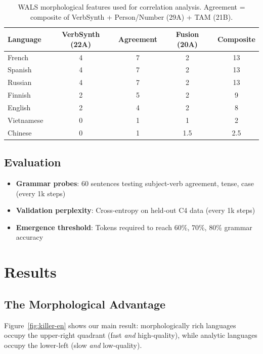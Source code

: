 \documentclass[11pt]{article}
\begin{document}
\begin{table}[h]
\centering
\begin{tabular}{lcccc}
\toprule
Language & VerbSynth (22A) & Agreement & Fusion (20A) & Composite \\
\midrule
French & 4 & 7 & 2 & 13 \\
Spanish & 4 & 7 & 2 & 13 \\
Russian & 4 & 7 & 2 & 13 \\
Finnish & 2 & 5 & 2 & 9 \\
English & 2 & 4 & 2 & 8 \\
Vietnamese & 0 & 1 & 1 & 2 \\
Chinese & 0 & 1 & 1.5 & 2.5 \\
\bottomrule
\end{tabular}
\caption{WALS morphological features used for correlation analysis. Agreement = composite of VerbSynth + Person/Number (29A) + TAM (21B).}
\label{tab:wals-en}
\end{table}

\subsection{Evaluation}

\begin{itemize}
    \item \textbf{Grammar probes}: 60 sentences testing subject-verb agreement, tense, case (every 1k steps)
    \item \textbf{Validation perplexity}: Cross-entropy on held-out C4 data (every 1k steps)
    \item \textbf{Emergence threshold}: Tokens required to reach 60\%, 70\%, 80\% grammar accuracy
\end{itemize}

\section{Results}

\subsection{The Morphological Advantage}

Figure~\ref{fig:killer-en} shows our main result: morphologically rich languages occupy the upper-right quadrant (fast \textit{and} high-quality), while analytic languages occupy the lower-left (slow \textit{and} low-quality).
\end{document}
